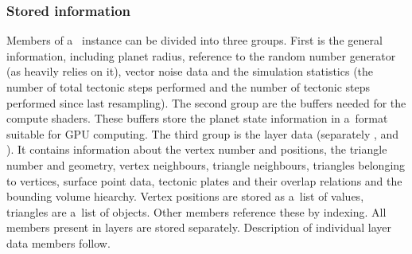 \subsubsection{Stored information}
Members of a~ instance can be divided into three groups. First is the general information, including planet radius, reference to the  random number generator (as  heavily relies on it), vector noise data and the simulation statistics (the number of total tectonic steps performed and the number of tectonic steps performed since last resampling). The second group are the buffers needed for the compute shaders. These buffers store the planet state information in a~format suitable for GPU computing. The third group is the layer data (separately ,  and ). It contains information about the vertex number and positions, the triangle number and geometry, vertex neighbours, triangle neighbours, triangles belonging to vertices, surface point data, tectonic plates and their overlap relations and the bounding volume hiearchy. Vertex positions are stored as a~list of  values, triangles are a~list of objects. Other members reference these by indexing. All members present in layers are stored separately. Description of individual layer data members follow.
